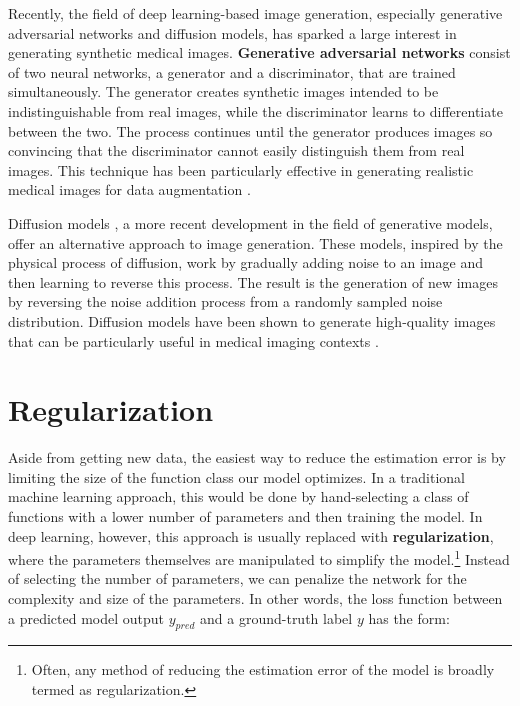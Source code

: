 Recently, the field of deep learning-based image generation, especially generative adversarial networks and diffusion models, has sparked a large interest in generating synthetic medical images. \textbf{Generative adversarial networks} \cite{goodfellowGenerativeAdversarialNetworks2014} consist of two neural networks, a generator and a discriminator, that are trained simultaneously. The generator creates synthetic images intended to be indistinguishable from real images, while the discriminator learns to differentiate between the two. The process continues until the generator produces images so convincing that the discriminator cannot easily distinguish them from real images. This technique has been particularly effective in generating realistic medical images for data augmentation \cite{shinMedicalImageSynthesis2018}.

Diffusion models \cite{ho2020denoising}, a more recent development in the field of generative models, offer an alternative approach to image generation. These models, inspired by the physical process of diffusion, work by gradually adding noise to an image and then learning to reverse this process. The result is the generation of new images by reversing the noise addition process from a randomly sampled noise distribution. Diffusion models have been shown to generate high-quality images that can be particularly useful in medical imaging contexts \cite{khaderDenoisingDiffusionProbabilistic2023}.

\section{Regularization}

Aside from getting new data, the easiest way to reduce the estimation error is by limiting the size of the function class our model optimizes. In a traditional machine learning approach, this would be done by hand-selecting a class of functions with a lower number of parameters and then training the model. In deep learning, however, this approach is usually replaced with \textbf{regularization}, where the parameters themselves are manipulated to simplify the model.\footnote{Often, any method of reducing the estimation error of the model is broadly termed as regularization.} Instead of selecting the number of parameters, we can penalize the network for the complexity and size of the parameters. In other words, the loss function between a predicted model output $y_{pred}$ and a ground-truth label $y$ has the form:

